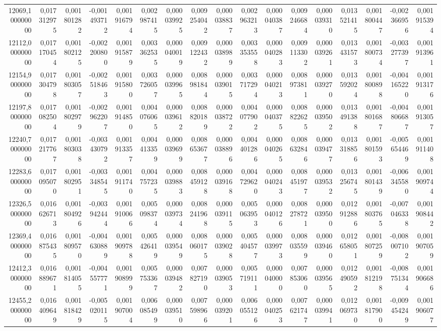 \begin{longtable}{rrrrrrrrrrrrrrrrr}
12069,100000000 & 0,017312975 & 0,001801282 & -0,001493712 & 0,001916794 & 0,002987415 & 0,000039925 & 0,009254042 & 0,000038837 & 0,002963213 & 0,000040387 & 0,009246684 & 0,000039310 & 0,013521415 & 0,001800447 & -0,002366956 & 0,001915394\\
12112,000000000 & 0,017170454 & 0,001802125 & -0,002200800 & 0,001915879 & 0,003362535 & 0,000040019 & 0,009122432 & 0,000038989 & 0,003353558 & 0,000040283 & 0,009113302 & 0,000039261 & 0,013431573 & 0,001800734 & -0,003277397 & 0,001913961\\
12154,900000000 & 0,017304798 & 0,001803057 & -0,002518463 & 0,001915800 & 0,003726057 & 0,000039965 & 0,008981844 & 0,000039015 & 0,003717294 & 0,000040213 & 0,008973811 & 0,000039270 & 0,013592024 & 0,001800898 & -0,004165220 & 0,001913176\\
12197,800000000 & 0,017082504 & 0,001802979 & -0,002962207 & 0,001914850 & 0,004076065 & 0,000039612 & 0,008820189 & 0,000038722 & 0,004077902 & 0,000040375 & 0,008822625 & 0,000039502 & 0,013491388 & 0,001801687 & -0,004806687 & 0,001913057\\
12240,700000000 & 0,017217767 & 0,001803038 & -0,003430792 & 0,001913357 & 0,004413359 & 0,000039699 & 0,008653677 & 0,000038896 & 0,004401286 & 0,000040265 & 0,008632846 & 0,000039477 & 0,013318856 & 0,001801593 & -0,005654469 & 0,001911408\\
12283,600000000 & 0,017095070 & 0,001802951 & -0,003348545 & 0,001911740 & 0,004757235 & 0,000039883 & 0,008459128 & 0,000039168 & 0,004729620 & 0,000040243 & 0,008451977 & 0,000039532 & 0,013256745 & 0,001801439 & -0,006345580 & 0,001909744\\
12326,500000000 & 0,016626713 & 0,001804926 & -0,003942444 & 0,001910066 & 0,005098374 & 0,000039734 & 0,008241968 & 0,000039115 & 0,005063953 & 0,000040126 & 0,008278721 & 0,000039500 & 0,012912886 & 0,001803765 & -0,007046338 & 0,001908442\\
12369,400000000 & 0,016875435 & 0,001809570 & -0,004630889 & 0,001909788 & 0,005426419 & 0,000039549 & 0,008060175 & 0,000039028 & 0,005404577 & 0,000039973 & 0,008035599 & 0,000039460 & 0,012658051 & 0,001807259 & -0,008007102 & 0,001907059\\
12412,300000000 & 0,016889671 & 0,001814055 & -0,004557771 & 0,001908999 & 0,005753367 & 0,000039482 & 0,007827190 & 0,000039053 & 0,005719111 & 0,000040000 & 0,007853060 & 0,000039565 & 0,012490592 & 0,001812198 & -0,008751344 & 0,001906686\\
12455,200000000 & 0,016409649 & 0,001818429 & -0,005020115 & 0,001907004 & 0,006085499 & 0,000039510 & 0,007598966 & 0,000039201 & 0,006055126 & 0,000040253 & 0,007621747 & 0,000039941 & 0,012069730 & 0,001817900 & -0,009454249 & 0,001906077\\

\end{longtable}
